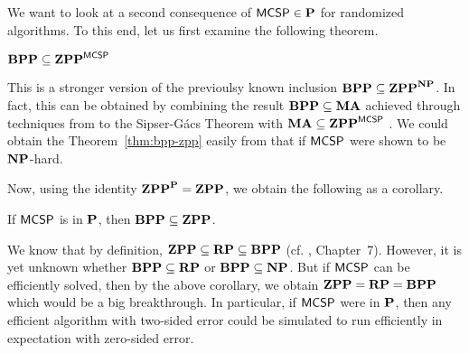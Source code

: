 \documentclass[11pt]{article}
\begin{document}



\bigskip

We want to look at a second consequence of $\mathprob{MCSP} \in \P$
for randomized algorithms.
To this end, let us first examine the following theorem.

\begin{theorem}[\cite{10.1145/335305.335314}]
  \label{thm:bpp-zpp}
	$\BPP \subseteq \ZPP^{\mathprob{MCSP}}$
\end{theorem}

This is a stronger version of the previoulsy known inclusion
$\BPP \subseteq \ZPP^{\NP}$.
In fact, this can be obtained by combining the result
$\BPP \subseteq \MA$ achieved through techniques from to the Sipser-G\'acs
Theorem with $\MA \subseteq \ZPP^{\mathprob{MCSP}}$ \cite{goldreich97}.
We could obtain the Theorem~\ref{thm:bpp-zpp} easily from that if
$\mathprob{MCSP}$ were shown to be $\NP$-hard.

Now, using the identity $\ZPP^\P = \ZPP$, we obtain the following as a corollary.

\begin{corollary}
	If $\mathprob{MCSP}$ is in $\P$, then $\BPP \subseteq \ZPP$.
\end{corollary}

We know that by definition, $\ZPP \subseteq \RP \subseteq \BPP$
(cf. \cite{arora2009}, Chapter~7).
However, it is yet unknown whether
$\BPP \subseteq \RP$ or $\BPP \subseteq \NP$.
But if $\mathprob{MCSP}$ can be
efficiently solved, then by the above corollary, we obtain $\ZPP = \RP = \BPP$
which would be a big breakthrough.
%
In particular, if $\mathprob{MCSP}$ were in $\P$, then any efficient algorithm
with two-sided error could be simulated to run efficiently in
expectation with zero-sided error.
\end{document}
